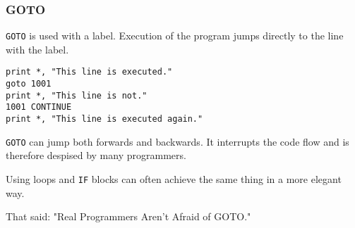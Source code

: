 \begin{frame}[fragile]
  \frametitle{GOTO}

  \texttt{GOTO} is used with a label. 
  Execution of the program jumps directly to the line with the label.

  \begin{lstlisting}
print *, "This line is executed."
goto 1001
print *, "This line is not."
1001 CONTINUE
print *, "This line is executed again."
  \end{lstlisting}

  \texttt{GOTO} can jump both forwards and backwards. 
  It interrupts the code flow and is therefore despised by many programmers.

  Using loops and \texttt{IF} blocks can often achieve the same thing in a more
  elegant way.

  That said: "Real Programmers Aren't Afraid of GOTO."

\end{frame}
